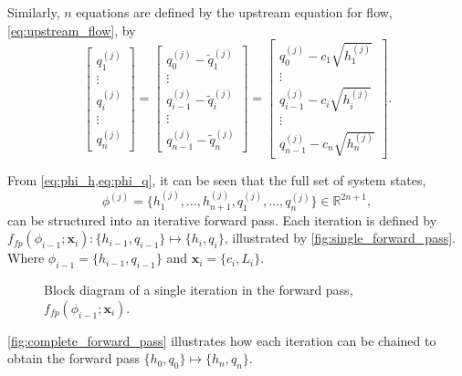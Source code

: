 Similarly, $n$ equations are defined by the upstream equation for flow, \cref{eq:upstream_flow}, by
\begin{equation}
\label{eq:phi_q}
    \begin{bmatrix}
    q_1^{(j)}\\[0.4em]
    \vdots\\
    q_i^{(j)}\\
    \vdots\\
    q_{n}^{(j)}
    \end{bmatrix}
    =
    \begin{bmatrix}
    q_0^{(j)}-\tilde{q}^{(j)}_1\\[0.4em]
    \vdots\\
    q_{i-1}^{(j)}-\tilde{q}^{(j)}_{i}\\
    \vdots\\
    q_{n-1}^{(j)}-\tilde{q}^{(j)}_{n}
    \end{bmatrix}
    =
    \begin{bmatrix}
    q_0^{(j)} - c_1 \sqrt{h_1^{(j)}}\\[0.4em]
    \vdots\\
    q_{i-1}^{(j)} - c_{i} \sqrt{h_{i}^{(j)}}\\
    \vdots\\
    q_{n-1}^{(j)} - c_{n} \sqrt{h_{n}^{(j)}}
    \end{bmatrix}.
\end{equation}


From \cref{eq:phi_h,eq:phi_q}, it can be seen that the full set of system states,
\begin{equation*}
    \phi^{(j)}=\{h_1^{(j)},\dots,h_{n+1}^{(j)},q_1^{(j)},\dots,q_{n}^{(j)}\}\in\mathbb{R}^{2n+1},
\end{equation*}
can be structured into an iterative forward pass. Each iteration is defined by $f_{fp}({\phi_{i-1}};\mathbf{x}_i): \{h_{i-1},q_{i-1}\}\mapsto\{h_{i},q_{i}\}$, illustrated by \autoref{fig:single_forward_pass}. Where $\phi_{i-1}=\{h_{i-1},q_{i-1}\}$ and $\mathbf{x}_i=\{c_i,L_i\}$. 

\begin{figure}[h!]
    \centering
    
    \caption{Block diagram of a single iteration in the forward pass, $f_{fp}({\phi_{i-1}};\mathbf{x}_i)$.}
    \label{fig:single_forward_pass}
\end{figure}

\autoref{fig:complete_forward_pass} illustrates how each iteration can be chained to obtain the forward pass $\{h_{0},q_{0}\}\mapsto\{h_{n}, q_n\}$. 

